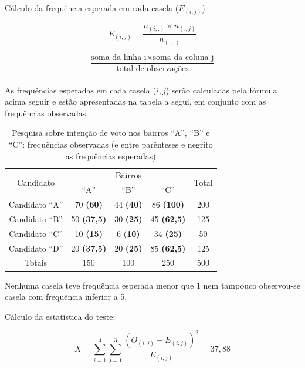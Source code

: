 \documentclass[
]{book}
\begin{document}
Cálculo da frequência esperada em cada casela (\(E_{(i,j)}\)):

\hfill\break

\[
E_{(i,j)} = \frac{n_{(i,.)} \times n_{(.,j)}}{n_{(.,.)}}
\]

\hfill\break

\[
\frac{\text{soma da linha i} \times \text{soma da coluna j}}{\text{total de observações}}
\]\\

As frequências esperadas em cada casela (\(i,j\)) serão calculadas pela fórmula acima seguir e estão apresentadas na tabela a segui, em conjunto com as frequências observadas.

\hfill\break

\begin{table}[h]
\centering
\caption{Pesquisa sobre intenção de voto nos bairros ``A'', ``B'' e ``C'': frequências observadas (e entre parênteses e negrito as frequências esperadas)}
\begin{tabular}{|c|c|c|c|c|}
\hline 
\multirow{2}{*}{Candidato}   & \multicolumn{3}{c|}{Bairros} & \multirow{2}{*}{Total} \\ 
\cline{2-4}
         & ``A'' & ``B'' & ``C'' &  \\
\hline       
  Candidato ``A''  & 70 \textbf{(60)}& 44 \textbf{(40)} & 86 \textbf{(100)} & 200 \\
\hline
  Candidato ``B'' & 50 \textbf{(37,5)} & 30 \textbf{(25)} & 45 \textbf{(62,5)} & 125 \\
\hline
  Candidato ``C'' & 10 \textbf{(15)} & 6 (\textbf{10)} & 34 \textbf{(25)} & 50 \\
\hline
  Candidato ``D''  & 20 \textbf{(37,5)} & 20 \textbf{(25)} & 85 \textbf{(62,5)} & 125 \\
\hline
  Totais & 150  & 100  & 250 & 500 \\
\hline 
\end{tabular} 
\end{table}

\hfill\break

\hfill\break

Nenhuma casela teve frequência esperada menor que 1 nem tampouco observou-se casela com frequência inferior a 5.

\hfill\break

Cálculo da estatística do teste:

\hfill\break

\[
X=\sum_{i=1}^4\sum_{j=1}^3 \frac{(O_{(i,j)} - E_{(i,j)})^2}{E_{(i,j)}} = 37,88
\]
\end{document}
